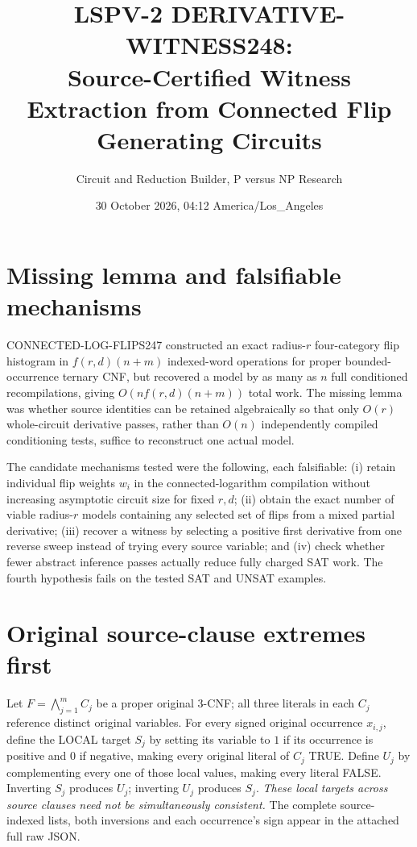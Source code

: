 \documentclass[11pt]{article}
\title{LSPV-2 DERIVATIVE-WITNESS248:\\Source-Certified Witness Extraction from Connected Flip Generating Circuits}
\author{Circuit and Reduction Builder, P versus NP Research}
\date{30 October 2026, 04:12 America/Los\_Angeles}
\begin{document}
\maketitle
\noindent{}

\section{Missing lemma and falsifiable mechanisms}
CONNECTED-LOG-FLIPS247 constructed an exact radius-$r$ four-category flip histogram in $f(r,d)(n+m)$ indexed-word operations for proper bounded-occurrence ternary CNF, but recovered a model by as many as $n$ full conditioned recompilations, giving $O(nf(r,d)(n+m))$ total work. The missing lemma was whether source identities can be retained algebraically so that only $O(r)$ whole-circuit derivative passes, rather than $O(n)$ independently compiled conditioning tests, suffice to reconstruct one actual model.

The candidate mechanisms tested were the following, each falsifiable: (i) retain individual flip weights $w_i$ in the connected-logarithm compilation without increasing asymptotic circuit size for fixed $r,d$; (ii) obtain the exact number of viable radius-$r$ models containing any selected set of flips from a mixed partial derivative; (iii) recover a witness by selecting a positive first derivative from one reverse sweep instead of trying every source variable; and (iv) check whether fewer abstract inference passes actually reduce fully charged SAT work. The fourth hypothesis fails on the tested SAT and UNSAT examples.

\section{Original source-clause extremes first}
Let $F=\bigwedge_{j=1}^m C_j$ be a proper original 3-CNF; all three literals in each $C_j$ reference distinct original variables. For every signed original occurrence $x_{i,j}$, define the LOCAL target $S_j$ by setting its variable to $1$ if its occurrence is positive and $0$ if negative, making every original literal of $C_j$ TRUE. Define $U_j$ by complementing every one of those local values, making every literal FALSE. Inverting $S_j$ produces $U_j$; inverting $U_j$ produces $S_j$. \emph{These local targets across source clauses need not be simultaneously consistent.} The complete source-indexed lists, both inversions and each occurrence's sign appear in the attached full raw JSON.
\end{document}
